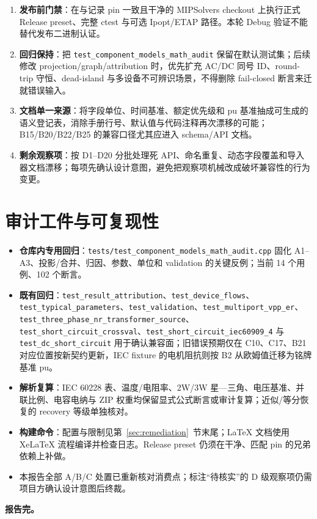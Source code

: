 \documentclass[11pt,a4paper,fontset=fandol]{ctexart}
\newcommand{\file}[1]{\texttt{#1}}
\begin{document}
\begin{enumerate}
  \item \textbf{发布前门禁}：在与记录 pin 一致且干净的 MIPSolvers checkout 上执行正式 Release preset、完整 ctest 与可选 Ipopt/ETAP 路径。本轮 Debug 验证不能替代发布二进制认证。
  \item \textbf{回归保持}：把 \file{test\_component\_models\_math\_audit} 保留在默认测试集；后续修改 projection/graph/attribution 时，优先扩充 AC/DC 同号 ID、round-trip 守恒、dead-island 与多设备不可辨识场景，不得删除 fail-closed 断言来迁就错误输入。
  \item \textbf{文档单一来源}：将字段单位、时间基准、额定优先级和 pu 基准抽成可生成的语义登记表，消除手册行号、默认值与代码注释再次漂移的可能；B15/B20/B22/B25 的兼容口径尤其应进入 schema/API 文档。
  \item \textbf{剩余观察项}：按 D1--D20 分批处理死 API、命名重复、动态字段覆盖和导入器文档漂移；每项先确认设计意图，避免把观察项机械改成破坏兼容性的行为变更。
\end{enumerate}

\section{审计工件与可复现性}

\begin{itemize}
  \item \textbf{仓库内专用回归}：\file{tests/test\_component\_models\_math\_audit.cpp} 固化 A1--A3、投影/合并、归因、参数、单位和 validation 的关键反例；当前 14 个用例、102 个断言。
  \item \textbf{既有回归}：\file{test\_result\_attribution}、\file{test\_device\_flows}、\file{test\_typical\_parameters}、\file{test\_validation}、\file{test\_multiport\_vpp\_er}、\file{test\_three\_phase\_nr\_transformer\_source}、\file{test\_short\_circuit\_crossval}、\file{test\_short\_circuit\_iec60909\_4} 与 \file{test\_dc\_short\_circuit} 用于确认兼容面；旧错误预期仅在 C10、C17、B21 对应位置按新契约更新，IEC fixture 的电机阻抗则按 B2 从欧姆值迁移为铭牌基准 pu。
  \item \textbf{解析复算}：IEC 60228 表、温度/电阻率、2W/3W 星---三角、电压基准、并联比例、电容电纳与 ZIP 权重均保留显式公式断言或审计复算；近似/等分恢复的 recovery 等级单独核对。
  \item \textbf{构建命令}：配置与限制见第~\ref{sec:remediation}~节末尾；LaTeX 文档使用 XeLaTeX 流程编译并检查日志。Release preset 仍须在干净、匹配 pin 的兄弟依赖上补做。
  \item 本报告全部 A/B/C 处置已重新核对消费点；标注``待核实''的 D 级观察项仍需项目方确认设计意图后终裁。
\end{itemize}

\vspace{1.5em}
\noindent\textbf{报告完。}
\end{document}
